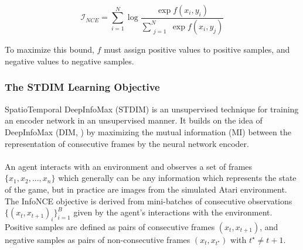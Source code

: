 \documentclass{article}
\begin{document}
\begin{equation}
\mathcal{I}_{NCE}=\sum_{i=1}^N\log{\frac{\exp{f(x_i,y_i)}}{\sum\limits_{\substack{j=1}}^N \exp{f(x_i,y_j)}}}
\label{eqn:info-nce}
\end{equation}

To maximize this bound, $f$ must assign positive values to positive samples, and negative values to negative samples.

\subsubsection{The STDIM Learning Objective}
SpatioTemporal DeepInfoMax (STDIM) is an unsupervised technique for training an encoder network in an unsupervised manner. It builds on the idea of DeepInfoMax (DIM, \cite{DIM}) by maximizing the mutual information (MI) between the representation of consecutive frames by the neural network encoder.
\\\\
An agent interacts with an environment and observes a set of frames $\{x_1, x_2,...,x_n\}$ which generally can be any information which represents the state of the game, but in practice are images from the simulated Atari environment. The InfoNCE objective is derived from mini-batches of consecutive observations $\{(x_t,x_{t+1})_i\}_{i=1}^{B}$ given by the agent's interactions with the environment. Positive samples are defined as pairs of consecutive frames $(x_t,x_{t+1})$, and negative samples as pairs of non-consecutive frames $(x_t,x_{t^\star})$ with $t^\star\ne t+1$. \\
\end{document}
